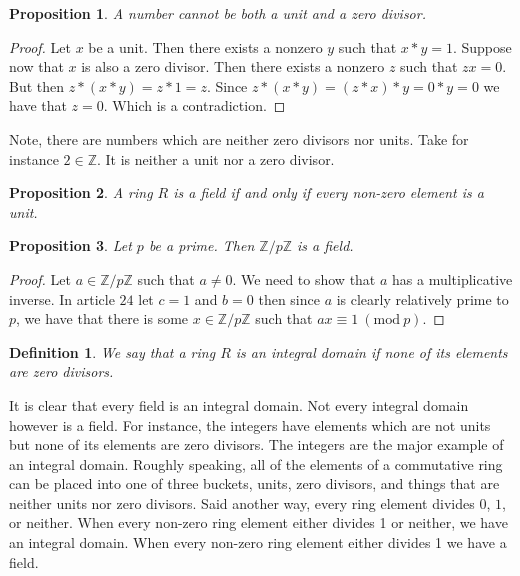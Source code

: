 \documentclass{article}
\theoremstyle{problemstyle}
\newtheorem{proposition}{Proposition}
\newtheorem{definition}{Definition}
\newcommand{\Mod}[1]{\ (\mathrm{mod}\ #1)}
\begin{document}

\begin{proposition}
A number cannot be both a unit and a zero divisor.  
\end{proposition}

\begin{proof}
Let $x$ be a unit. Then there exists a nonzero $y$ such that $x*y = 1$. Suppose now that $x$ is also a zero divisor. Then there exists a nonzero $z$ such that $zx = 0$. But then $z*(x*y) = z*1 = z$. Since  $z*(x*y) = (z*x)*y = 0*y = 0$ we have that $z = 0$. Which is a contradiction.  
\end{proof}

Note, there are numbers which are neither zero divisors nor units. Take for instance $2 \in \mathbb{Z}$. It is neither a unit nor a zero divisor. 

\begin{proposition}
A ring $R$ is a field if and only if every non-zero element is a unit. 
\end{proposition}

\begin{proposition}
Let $p$ be a prime. Then $\mathbb{Z}/p\mathbb{Z}$ is a field. 
\end{proposition}

\begin{proof}
Let $a \in \mathbb{Z}/p\mathbb{Z}$ such that $a \neq 0$. We need to show that $a$ has a multiplicative inverse. In article $24$ let $c = 1$ and $b = 0$ then since $a$ is clearly relatively prime to $p$, we have that there is some $x \in \mathbb{Z}/p\mathbb{Z}$ such that $ax \equiv 1 \Mod{p}$.
\end{proof}

\begin{definition}
We say that a ring $R$ is an integral domain if none of its elements are zero divisors. 
\end{definition}

It is clear that every field is an integral domain. Not every integral domain however is a field. For instance, the integers have elements which are not units but none of its elements are zero divisors. The integers are the major example of an integral domain. Roughly speaking, all of the elements of a commutative ring can be placed into one of three buckets, units, zero divisors, and things that are neither units nor zero divisors. Said another way, every ring element divides $0$, $1$, or neither. When every non-zero ring element either divides 1 or neither, we have an integral domain. When every non-zero ring element either divides 1 we have a field. \\
\end{document}
